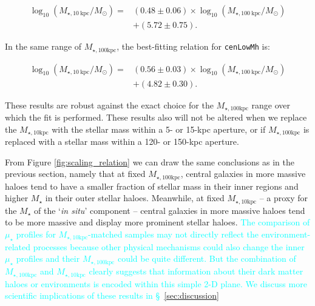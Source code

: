 \documentclass[a4paper,fleqn,usenatbib]{mnras}
\def\nbcg{\texttt{cenLowMh}}
\def\mstar{{$M_{\star}$}}
\def\minn{{$M_{\star,10\mathrm{kpc}}$}}
\def\mtot{{$M_{\star,100\mathrm{kpc}}$}}
\def\mden{{$\mu_{\star}$}}
\newcommand{\song}[1]{\textcolor{cyan}{#1}}
\begin{document}
    \begin{equation}
        \begin{aligned}
        \log_{10} (M_{\star, 10\ \mathrm{kpc}}/M_{\odot}) = & (0.48\pm0.06) \times \log_{10} (M_{\star, 100\ \mathrm{kpc}}/M_{\odot}) \\ & +(5.72\pm0.75).
        \end{aligned}
    \end{equation}
    
    \noindent In the same range of \mtot{}, the best-fitting relation for \nbcg{} is:
     
    \begin{equation}
        \begin{aligned}
        \log_{10} (M_{\star, 10\ \mathrm{kpc}}/M_{\odot}) = & (0.56\pm0.03) \times \log_{10} (M_{\star, 100\ \mathrm{kpc}}/M_{\odot}) \\ & +(4.82\pm0.30).
        \end{aligned}
    \end{equation}
    
    These results are robust against the exact choice for the \mtot{} range over which 
    the fit is performed. 
    These results also will not be altered when we replace the \minn{} with the stellar 
    mass within a 5- or 15-kpc aperture, or if \mtot{} is replaced with a stellar mass 
    within a 120- or 150-kpc aperture.  
     
    From Figure \ref{fig:scaling_relation} we can draw the same conclusions as in 
    the previous section, namely that 
    at fixed \mtot{}, central galaxies in more massive haloes tend to have a smaller 
    fraction of stellar mass in their inner regions and higher \mstar{} in their outer
    stellar haloes. 
    Meanwhile, at fixed \minn{} -- a proxy for the \mstar{} of the `\textit{in situ}' 
    component -- central galaxies in more massive haloes tend to be more massive and 
    display more prominent stellar haloes. 
    \song{
    The comparison of \mden{} profiles for \minn{}-matched samples may not directly
    reflect the environment-related processes because other physical mechanisms could 
    also change the inner \mden{} profiles and their \mtot{} could be quite different. 
    But the combination of \mtot{} and \minn{} clearly suggests that information about
    their dark matter haloes or environments is encoded within this simple 2-D plane. 
    We discuss more scientific implications of these results in 
    \S~\ref{sec:discussion}
    }
     
\end{document}
